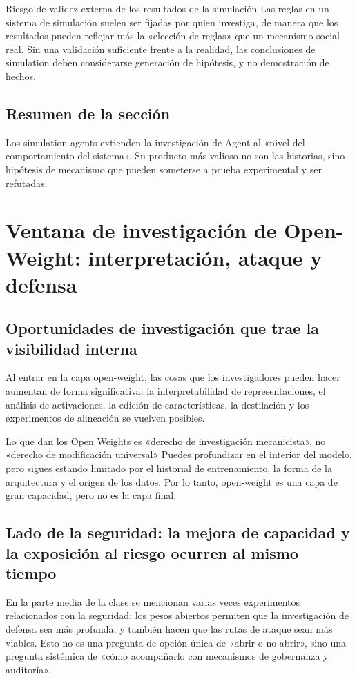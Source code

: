 \documentclass[a4paper]{article}
\begin{document}
\begin{warningbox}{Riesgo de validez externa de los resultados de la simulación}
Las reglas en un sistema de simulación suelen ser fijadas por quien investiga, de manera que los resultados pueden reflejar más la «elección de reglas» que un mecanismo social real.
Sin una validación suficiente frente a la realidad, las conclusiones de simulation deben considerarse generación de hipótesis, y no demostración de hechos.
\end{warningbox}

\subsection{Resumen de la sección}
Los simulation agents extienden la investigación de Agent al «nivel del comportamiento del sistema». Su producto más valioso no son las historias, sino hipótesis de mecanismo que pueden someterse a prueba experimental y ser refutadas.

\section{Ventana de investigación de Open-Weight: interpretación, ataque y defensa}

\subsection{Oportunidades de investigación que trae la visibilidad interna}
Al entrar en la capa open-weight, las cosas que los investigadores pueden hacer aumentan de forma significativa: la interpretabilidad de representaciones, el análisis de activaciones, la edición de características, la destilación y los experimentos de alineación se vuelven posibles.

\begin{importantbox}{Lo que dan los Open Weights es «derecho de investigación mecanicista», no «derecho de modificación universal»}
Puedes profundizar en el interior del modelo, pero sigues estando limitado por el historial de entrenamiento, la forma de la arquitectura y el origen de los datos.  
Por lo tanto, open-weight es una capa de gran capacidad, pero no es la capa final.
\end{importantbox}

\subsection{Lado de la seguridad: la mejora de capacidad y la exposición al riesgo ocurren al mismo tiempo}
En la parte media de la clase se mencionan varias veces experimentos relacionados con la seguridad: los pesos abiertos permiten que la investigación de defensa sea más profunda, y también hacen que las rutas de ataque sean más viables.  
Esto no es una pregunta de opción única de «abrir o no abrir», sino una pregunta sistémica de «cómo acompañarlo con mecanismos de gobernanza y auditoría».
\end{document}
